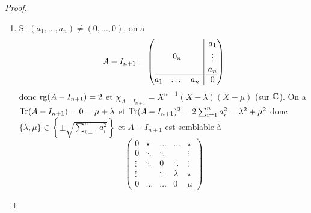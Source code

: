 \documentclass[12pt]{article}
\begin{document}
\begin{proof}
	\phantom{}
	\begin{enumerate}
		\item Si $(a_{1},\dots,a_{n})\neq(0,\dots,0)$, on a 
		\begin{equation}
			A-I_{n+1}=
			\left(
			\begin{array}{@{}c|c@{}}
			0_{n} &
			\begin{matrix}
				a_{1}\\
				\vdots\\
				a_{n}
				\end{matrix}
				\\
			\hline
			\begin{matrix}
				a_{1} &
				\dots
				& a_{n}
				\end{matrix}
				& 0
			\end{array}
			\right)
		\end{equation}
		donc $\operatorname{rg}(A-I_{n+1})=2$ et $\chi_{A-I_{n+1}}=X^{n-1}(X-\lambda)(X-\mu)$ (sur $\mathbb{C}$). On a $\operatorname{Tr}(A-I_{n+1})=0=\mu+\lambda$ et $\operatorname{Tr}(A-I_{n+1})^{2}=2\sum_{i=1}^{n}a_{i}^{2}=\lambda^{2}+\mu^{2}$ donc $\lbrace\lambda,\mu\rbrace\in\left\lbrace\pm\sqrt{\sum_{i=1}^{n}a_{i}^{2}}\right\rbrace$ et $A-I_{n+1}$ est semblable à 
		\begin{equation}
			\begin{pmatrix}
				0&\star&\dots&\dots&\star\\
				0&\ddots&\ddots&&\vdots\\
				\vdots&\ddots&0&\ddots&\vdots\\
				\vdots&&\ddots&\lambda&\star\\
				0&\dots&\dots&0&\mu
			\end{pmatrix}
		\end{equation}


\end{enumerate}
\end{proof}
\end{document}
